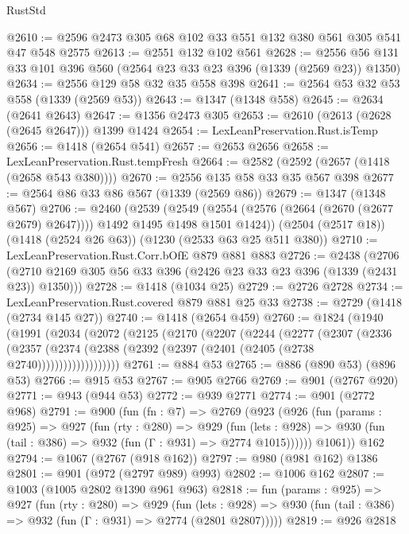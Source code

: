\begin{lexlean}{RustStd}
\begin{coremodule}
@2610 := @2596 @2473 @305 @68 @102 @33 @551 @132 @380 @561 @305 @541 @47 @548 @2575
@2613 := @2551 @132 @102 @561
@2628 := @2556 @56 @131 @33 @101 @396 @560 (@2564 @23 @33 @23 @396 (@1339 (@2569 @23)) @1350)
@2634 := @2556 @129 @58 @32 @35 @558 @398
@2641 := @2564 @53 @32 @53 @558 (@1339 (@2569 @53))
@2643 := @1347 (@1348 @558)
@2645 := @2634 (@2641 @2643)
@2647 := @1356 @2473 @305
@2653 := @2610 (@2613 (@2628 (@2645 @2647))) @1399 @1424
@2654 := LexLeanPreservation.Rust.isTemp
@2656 := @1418 (@2654 @541)
@2657 := @2653 @2656
@2658 := LexLeanPreservation.Rust.tempFresh
@2664 := @2582 (@2592 (@2657 (@1418 (@2658 @543 @380))))
@2670 := @2556 @135 @58 @33 @35 @567 @398
@2677 := @2564 @86 @33 @86 @567 (@1339 (@2569 @86))
@2679 := @1347 (@1348 @567)
@2706 := @2460
    (@2539
      (@2549 (@2554 (@2576 (@2664 (@2670 (@2677 @2679) @2647)))) @1492 @1495 @1498 @1501 @1424))
    (@2504 (@2517 @18))
    (@1418 (@2524 @26 @63))
    (@1230 (@2533 @63 @25 @511 @380))
@2710 := LexLeanPreservation.Rust.Corr.bOfE @879 @881 @883
@2726 := @2438
    (@2706 (@2710 @2169 @305 @56 @33 @396 (@2426 @23 @33 @23 @396 (@1339 (@2431 @23)) @1350)))
@2728 := @1418 (@1034 @25)
@2729 := @2726 @2728
@2734 := LexLeanPreservation.Rust.covered @879 @881 @25 @33
@2738 := @2729 (@1418 (@2734 @145 @27))
@2740 := @1418 (@2654 @459)
@2760 := @1824
    (@1940
      (@1991
        (@2034
          (@2072
            (@2125
              (@2170
                (@2207
                  (@2244
                    (@2277
                      (@2307
                        (@2336
                          (@2357
                            (@2374
                              (@2388 (@2392 (@2397 (@2401 (@2405 (@2738 @2740)))))))))))))))))))
@2761 := @884 @53
@2765 := @886 (@890 @53) (@896 @53)
@2766 := @915 @53
@2767 := @905 @2766
@2769 := @901 (@2767 @920)
@2771 := @943 (@944 @53)
@2772 := @939 @2771
@2774 := @901 (@2772 @968)
@2791 := @900
    (fun (fn : @7) =>
    @2769
      (@923
        (@926
          (fun (params : @925) =>
          @927
            (fun (rty : @280) =>
            @929
              (fun (lets : @928) =>
              @930 (fun (tail : @386) => @932 (fun (Γ : @931) => @2774 @1015))))))
        @1061))
    @162
@2794 := @1067 (@2767 (@918 @162))
@2797 := @980 (@981 @162) @1386
@2801 := @901 (@972 (@2797 @989) @993)
@2802 := @1006 @162
@2807 := @1003 (@1005 @2802 @1390 @961 @963)
@2818 := fun (params : @925) =>
  @927
    (fun (rty : @280) =>
    @929
      (fun (lets : @928) =>
      @930 (fun (tail : @386) => @932 (fun (Γ : @931) => @2774 (@2801 @2807)))))
@2819 := @926 @2818

\end{coremodule}
\end{lexlean}
